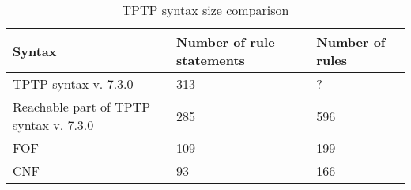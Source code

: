 \begin{table}[H]
\centering
\renewcommand{\arraystretch}{1.5}
\caption{TPTP syntax size comparison}
\begin{adjustbox}{width=1\textwidth, center=\textwidth}
\begin{tabular}{lll}
\textbf{Syntax} & \textbf{Number of rule statements} & \textbf{Number of rules}\\\hline
TPTP syntax v. 7.3.0 & 313 & ?\\
Reachable part of TPTP syntax v. 7.3.0 & 285 & 596\\
FOF & 109 & 199\\
CNF & 93 & 166\\
\end{tabular}
\end{adjustbox}
\label{tbl:EvaluationSyntaxSize}
\end{table}
